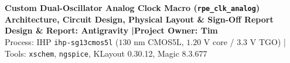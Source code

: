 \documentclass[10pt,a4paper]{article}
\begin{document}
\begin{center}
  {\LARGE\bfseries\color{AccentBlue} Custom Dual-Oscillator Analog Clock Macro (\texttt{rpe\_clk\_analog})\\[3pt]
  Architecture, Circuit Design, Physical Layout \& Sign-Off Report}\\[6pt]
  {\normalsize\bfseries Design \& Report: Antigravity \quad|\quad Project Owner: Tim}\\[3pt]
  {\normalsize Process: IHP \texttt{ihp-sg13cmos5l} ($130\text{ nm}$ CMOS5L, $1.20\text{ V}$ core / $3.3\text{ V}$ TGO) \quad|\quad
  Tools: \texttt{xschem}, \texttt{ngspice}, KLayout 0.30.12, Magic 8.3.677}
\end{center}
\vspace{0pt}
\end{document}
